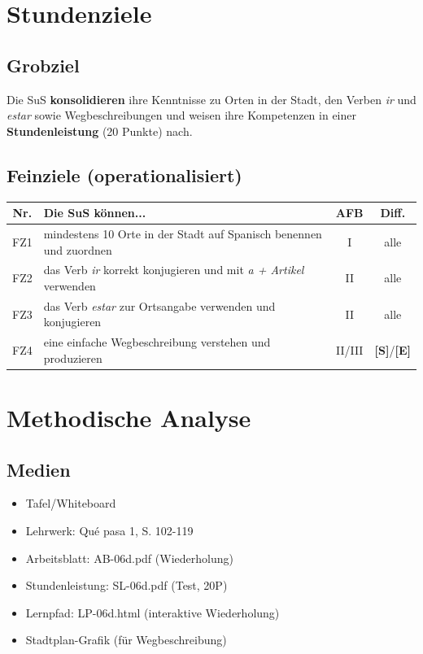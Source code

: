 \documentclass[11pt,a4paper]{article}
\newcommand{\lehrwerk}{Qué pasa 1}
\newcommand{\lehrwerkseite}{S. 102-119}
\newcommand{\Std}{\textcolor{standard}{\textbf{[S]}}}
\newcommand{\E}{\textcolor{erweiterung}{\textbf{[E]}}}
\begin{document}
\section{Stundenziele}

\subsection{Grobziel}
Die SuS \textbf{konsolidieren} ihre Kenntnisse zu Orten in der Stadt, den Verben \textit{ir} und \textit{estar} sowie Wegbeschreibungen und weisen ihre Kompetenzen in einer \textbf{Stundenleistung} (20 Punkte) nach.

\subsection{Feinziele (operationalisiert)}
\begin{tabular}{|c|p{8cm}|c|c|}
\hline
\textbf{Nr.} & \textbf{Die SuS können...} & \textbf{AFB} & \textbf{Diff.} \\
\hline
FZ1 & mindestens 10 Orte in der Stadt auf Spanisch benennen und zuordnen & I & alle \\
\hline
FZ2 & das Verb \textit{ir} korrekt konjugieren und mit \textit{a + Artikel} verwenden & II & alle \\
\hline
FZ3 & das Verb \textit{estar} zur Ortsangabe verwenden und konjugieren & II & alle \\
\hline
FZ4 & eine einfache Wegbeschreibung verstehen und produzieren & II/III & \Std{}/\E{} \\
\hline
\end{tabular}

\section{Methodische Analyse}

\subsection{Medien}
\begin{itemize}
    \item Tafel/Whiteboard
    \item Lehrwerk: \lehrwerk, \lehrwerkseite
    \item Arbeitsblatt: AB-06d.pdf (Wiederholung)
    \item Stundenleistung: SL-06d.pdf (Test, 20P)
    \item Lernpfad: LP-06d.html (interaktive Wiederholung)
    \item Stadtplan-Grafik (für Wegbeschreibung)
\end{itemize}
\end{document}
